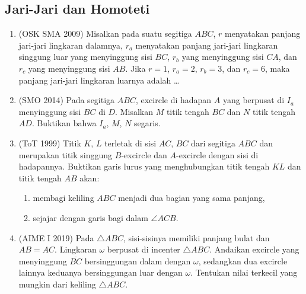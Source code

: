\documentclass[12pt]{scrartcl}
\begin{document}
\subsection{Jari-Jari dan Homoteti}
\begin{enumerate}[resume]

	\item (OSK SMA 2009)
	Misalkan pada suatu segitiga $ABC$, $r$ menyatakan panjang jari-jari
	lingkaran dalamnya, $r_a$ menyatakan panjang jari-jari lingkaran
	singgung luar yang menyinggung sisi $BC$, $r_b$ yang menyinggung sisi
	$CA$, dan $r_c$ yang menyinggung sisi $AB$.
	Jika $r = 1$, $r_a = 2$, $r_b = 3$, dan $r_c = 6$,
	maka panjang jari-jari lingkaran luarnya adalah \dots

	\item (SMO 2014)
	Pada segitiga $ABC$, excircle di hadapan $A$ yang berpusat di $I_a$
	menyinggung sisi $BC$ di $D$.
	Misalkan $M$ titik tengah $BC$ dan $N$ titik tengah $AD$.
	Buktikan bahwa $I_a$, $M$, $N$ segaris.

	\item (ToT 1999)
	Titik $K$, $L$ terletak di sisi $AC$, $BC$ dari segitiga $ABC$
	dan merupakan titik singgung $B$-excircle dan $A$-excircle
	dengan sisi di hadapannya.
	Buktikan garis lurus yang menghubungkan titik tengah $KL$
	dan titik tengah $AB$ akan:
	\begin{enumerate}
		\item membagi keliling $ABC$ menjadi dua bagian yang sama panjang,
		\item sejajar dengan garis bagi dalam $\angle ACB$.
	\end{enumerate}

	\item (AIME I 2019)
	Pada $\triangle ABC$, sisi-sisinya memiliki panjang bulat dan $AB = AC$.
	Lingkaran $\omega$ berpusat di incenter $\triangle ABC$.
	Andaikan excircle yang menyinggung $\overline{BC}$ bersinggungan dalam
	dengan $\omega$, sedangkan dua excircle lainnya keduanya bersinggungan
	luar dengan $\omega$.
	Tentukan nilai terkecil yang mungkin dari keliling $\triangle ABC$.

\end{enumerate}
\end{document}
